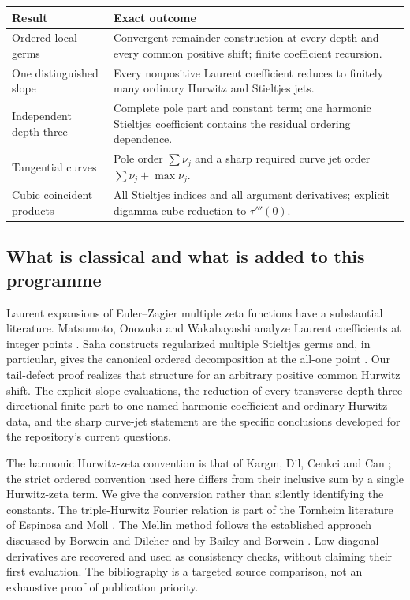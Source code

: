 \documentclass[11pt,letterpaper]{article}
\numberwithin{equation}{section}
\theoremstyle{definition}
\theoremstyle{remark}
\begin{document}
\begin{center}
\begin{tabular}{>{\raggedright\arraybackslash}p{}>{\raggedright\arraybackslash}p{}}
\toprule
Result & Exact outcome\\
\midrule
Ordered local germs & Convergent remainder construction at every depth and
every common positive shift; finite coefficient recursion.\\[4pt]
One distinguished slope & Every nonpositive Laurent coefficient reduces
to finitely many ordinary Hurwitz and Stieltjes jets.\\[4pt]
Independent depth three & Complete pole part and constant term; one
harmonic Stieltjes coefficient contains the residual ordering dependence.\\[4pt]
Tangential curves & Pole order $\sum\nu_j$ and a sharp required curve
jet order $\sum\nu_j+\max\nu_j$.\\[4pt]
Cubic coincident products & All Stieltjes indices and all argument
derivatives; explicit digamma-cube reduction to $\tau'''(0)$.\\
\bottomrule
\end{tabular}
\end{center}

\subsection{What is classical and what is added to this programme}

Laurent expansions of Euler--Zagier multiple zeta functions have a
substantial literature. Matsumoto, Onozuka and Wakabayashi analyze Laurent
coefficients at integer points \cite{MOW}. Saha constructs regularized
multiple Stieltjes germs and, in particular, gives the canonical
ordered decomposition at the all-one point \cite[Theorem 2]{Saha}.
Our tail-defect proof realizes that structure for an arbitrary
positive common Hurwitz shift. The explicit slope evaluations, the
reduction of every transverse depth-three directional finite part to
one named harmonic coefficient and ordinary Hurwitz data, and the
sharp curve-jet statement are the
specific conclusions developed for the repository's current questions.

The harmonic Hurwitz-zeta convention is that of Karg\i n, Dil,
Cenkci and Can \cite{Kargin}; the strict ordered convention used
here differs from their inclusive sum by a single Hurwitz-zeta term.
We give the conversion rather than silently identifying the constants.
The triple-Hurwitz Fourier relation is part of the Tornheim literature
of Espinosa and Moll \cite{EMTornheim}. The Mellin method follows the
established approach discussed by Borwein and Dilcher and by Bailey
and Borwein \cite{BorweinDilcher,BaileyBorwein}. Low diagonal derivatives
are recovered and used as consistency checks, without claiming their
first evaluation. The bibliography is a targeted source comparison,
not an exhaustive proof of publication priority.
\end{document}
